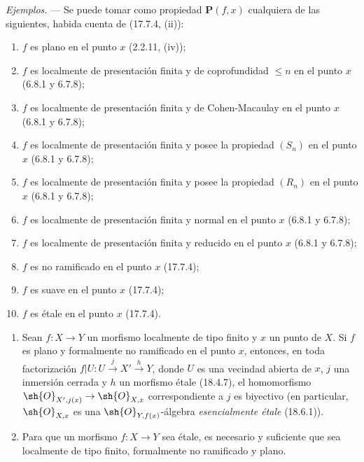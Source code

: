 \begin{env}[18.4.11]
\label{IV.18.4.11}
\emph{Ejemplos.} --- Se puede tomar como propiedad $\boldsymbol{P}(f,x)$ cualquiera de las siguientes, habida cuenta de (17.7.4, (ii)):
\begin{enumerate}
  \item[(i)] $f$ es plano en el punto $x$ (2.2.11, (iv));
  \item[(ii)] $f$ es localmente de presentación finita y de coprofundidad $\leq n$ en el punto $x$ (6.8.1 y 6.7.8);
  \item[(iii)] $f$ es localmente de presentación finita y de Cohen-Macaulay en el punto $x$ (6.8.1 y 6.7.8);
  \item[(iv)] $f$ es localmente de presentación finita y posee la propiedad $(S_n)$ en el punto $x$ (6.8.1 y 6.7.8);
  \item[(v)] $f$ es localmente de presentación finita y posee la propiedad $(R_n)$ en el punto $x$ (6.8.1 y 6.7.8);
  \item[(vi)] $f$ es localmente de presentación finita y normal en el punto $x$ (6.8.1 y 6.7.8);
  \item[(vii)] $f$ es localmente de presentación finita y reducido en el punto $x$ (6.8.1 y 6.7.8);
  \item[(viii)] $f$ es no ramificado en el punto $x$ (17.7.4);
  \item[(ix)] $f$ es suave en el punto $x$ (17.7.4);
  \item[(x)] $f$ es étale en el punto $x$ (17.7.4).
\end{enumerate}
\end{env}


\begin{corollary}[18.4.12]
\label{IV.18.4.12}
\begin{enumerate}
  \item[\textup{(i)}] Sean $f:X\to Y$ un morfismo localmente de tipo finito y $x$ un punto de $X$. Si $f$ es plano y formalmente no ramificado en el punto $x$, entonces, en toda factorización $f|U:U\xrightarrow{j}X'\xrightarrow{h}Y$, donde $U$ es una vecindad abierta de $x$, $j$ una inmersión cerrada y $h$ un morfismo étale \textup{(18.4.7)}, el homomorfismo $\sh{O}_{X',j(x)}\to\sh{O}_{X,x}$ correspondiente a $j$ es biyectivo \textup{(en particular, $\sh{O}_{X,x}$ es una $\sh{O}_{Y,f(x)}$-álgebra \emph{esencialmente étale} (18.6.1))}.
  \item[\textup{(ii)}] Para que un morfismo $f:X\to Y$ sea étale, es necesario y suficiente que sea localmente de tipo finito, formalmente no ramificado y plano.
\end{enumerate}
\end{corollary}

